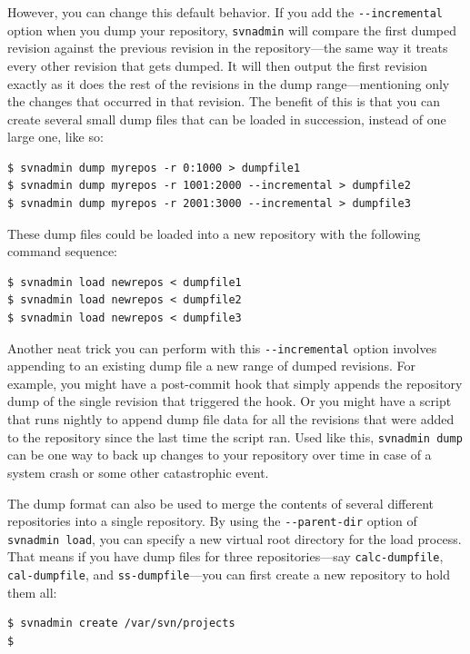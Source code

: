 However, you can change this default behavior. If you add the
\texttt{-\/-incremental} option when you dump your repository,
\texttt{svnadmin} will compare the first dumped revision against the
previous revision in the repository---the same way it treats every other
revision that gets dumped. It will then output the first revision
exactly as it does the rest of the revisions in the dump
range---mentioning only the changes that occurred in that revision. The
benefit of this is that you can create several small dump files that can
be loaded in succession, instead of one large one, like so:

\begin{verbatim}
$ svnadmin dump myrepos -r 0:1000 > dumpfile1
$ svnadmin dump myrepos -r 1001:2000 --incremental > dumpfile2
$ svnadmin dump myrepos -r 2001:3000 --incremental > dumpfile3
\end{verbatim}

These dump files could be loaded into a new repository with the
following command sequence:

\begin{verbatim}
$ svnadmin load newrepos < dumpfile1
$ svnadmin load newrepos < dumpfile2
$ svnadmin load newrepos < dumpfile3
\end{verbatim}

Another neat trick you can perform with this \texttt{-\/-incremental}
option involves appending to an existing dump file a new range of dumped
revisions. For example, you might have a post-commit hook that simply
appends the repository dump of the single revision that triggered the
hook. Or you might have a script that runs nightly to append dump file
data for all the revisions that were added to the repository since the
last time the script ran. Used like this, \texttt{svnadmin\ dump} can be
one way to back up changes to your repository over time in case of a
system crash or some other catastrophic event.

The dump format can also be used to merge the contents of several
different repositories into a single repository. By using the
\texttt{-\/-parent-dir} option of \texttt{svnadmin\ load}, you can
specify a new virtual root directory for the load process. That means if
you have dump files for three repositories---say \texttt{calc-dumpfile},
\texttt{cal-dumpfile}, and \texttt{ss-dumpfile}---you can first create a
new repository to hold them all:

\begin{verbatim}
$ svnadmin create /var/svn/projects
$
\end{verbatim}

